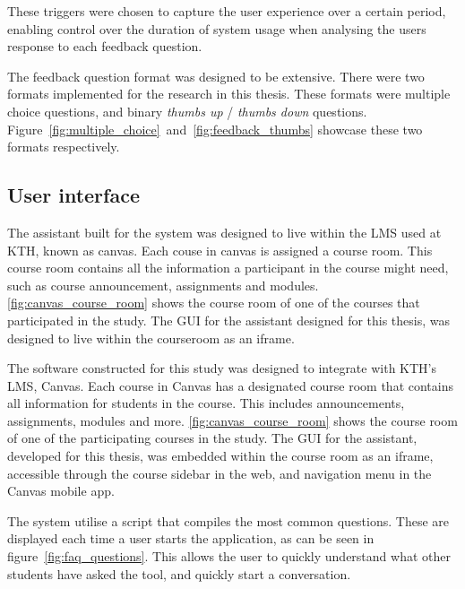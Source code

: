 These triggers were chosen to capture the user experience over a certain period, enabling control over the duration of system usage when analysing the users response to each feedback question.


The feedback question format was designed to be extensive. There were two formats implemented for the research in this thesis. These formats were multiple choice questions, and binary \textit{thumbs up} / \textit{thumbs down} questions. Figure~\ref{fig:multiple_choice}~and~\ref{fig:feedback_thumbs} showcase these two formats respectively.








\subsection{User interface}


The assistant built for the system was designed to live within the \gls{LMS} used at KTH, known as canvas. Each couse in canvas is assigned a course room. This course room contains all the information a participant in the course might need, such as course announcement, assignments and modules. \autoref{fig:canvas_course_room} shows the course room of one of the courses that participated in the study. The \gls{GUI} for the assistant designed for this thesis, was designed to live within the courseroom as an iframe.


The software constructed for this study was designed to integrate with KTH's \gls{LMS}, Canvas. Each course in Canvas has a designated course room that contains all information for students in the course. This includes announcements, assignments, modules and more. \autoref{fig:canvas_course_room} shows the course room of one of the participating courses in the study. The \gls{GUI} for the assistant, developed for this thesis, was embedded within the course room as an iframe, accessible through the course sidebar in the web, and navigation menu in the Canvas mobile app.





% 


The system utilise a script that compiles the most common questions. These are displayed each time a user starts the application, as can be seen in figure~\ref{fig:faq_questions}. This allows the user to quickly understand what other students have asked the tool, and quickly start a conversation.


